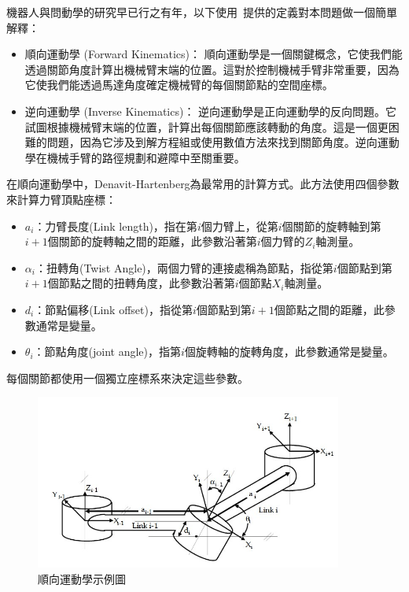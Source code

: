 \documentclass[class=NCU_thesis, crop=false]{standalone}
\begin{document}
機器人與問動學的研究早已行之有年，以下使用~\cite{kucuk2006robot}提供的定義對本問題做一個簡單解釋：
\begin{itemize}
	\item 順向運動學 (Forward Kinematics)： 順向運動學是一個關鍵概念，它使我們能透過關節角度計算出機械臂末端的位置。這對於控制機械手臂非常重要，因為它使我們能透過馬達角度確定機械臂的每個關節點的空間座標。

	\item 逆向運動學 (Inverse Kinematics)： 逆向運動學是正向運動學的反向問題。它試圖根據機械臂末端的位置，計算出每個關節應該轉動的角度。這是一個更困難的問題，因為它涉及到解方程組或使用數值方法來找到關節角度。逆向運動學在機械手臂的路徑規劃和避障中至關重要。
\end{itemize}

在順向運動學中，Denavit-Hartenberg為最常用的計算方式。此方法使用四個參數來計算力臂頂點座標： 
\begin{itemize}
    \item $a_{i}$：力臂長度(Link length)，指在第$i$個力臂上，從第$i$個關節的旋轉軸到第$i+1$個關節的旋轉軸之間的距離，此參數沿著第$i$個力臂的$Z_{i}$軸測量。
    \item $\alpha_{i}$：扭轉角(Twist Angle)，兩個力臂的連接處稱為節點，指從第$i$個節點到第$i+1$個節點之間的扭轉角度，此參數沿著第$i$個節點$X_{i}$軸測量。
    \item $d_{i}$：節點偏移(Link offset)，指從第$i$個節點到第$i+1$個節點之間的距離，此參數通常是變量。
    \item $\theta_{i}$：節點角度(joint angle)，指第$i$個旋轉軸的旋轉角度，此參數通常是變量。
\end{itemize}
每個關節都使用一個獨立座標系來決定這些參數。

\begin{figure}[htbp]
    \centering
    \includegraphics[width=0.9\textwidth]{figures/Coordinate frame assignment for a general manipulator.jpg}
\caption{順向運動學示例圖}
\end{figure}
\end{document}
